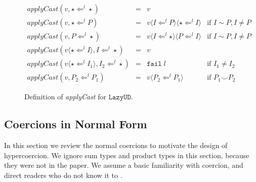 \documentclass[acmsmall,review,anonymous]{acmart}\settopmatter{printfolios=true,printccs=false,printacmref=false}
\newcommand{\stxrule}[3]{#1 & ::= & #3 & \text{#2}\\}
\newcommand{\lazyUD}{$\mathtt{Lazy UD}$}
\newcommand{\cOOcast}[3]{#3 \Leftarrow^{#2} #1}
\newcommand{\vOOcast}[2]{\langle#2\rangle#1}
\newcommand{\rOOfail}[1]{\mathtt{fail}\;#1}
\begin{document}
\begin{figure}
%
%  
  \[
  \begin{array}{rclr}
    \mathit{applyCast}(v, \cOOcast{\star}{l}{\star} ) &=& v \\
    \mathit{applyCast}(v, \cOOcast{P}{l}{\star}) &=&
        v \langle \cOOcast{P}{l}{I} \rangle
          \langle \cOOcast{I}{l}{\star} \rangle
        & \text{if } I \sim P, I \neq P \\  
    \mathit{applyCast}(v, \cOOcast{\star}{l}{P}) &=&          
        v \langle \cOOcast{\star}{l}{I} \rangle
          \langle \cOOcast{I}{l}{P} \rangle
        & \text{if } I \sim P, I \neq P \\  
  \mathit{applyCast}(v \langle \cOOcast{I}{l}{\star} \rangle , \cOOcast{\star}{l}{I}) &=& v \\
  \mathit{applyCast}(v \langle \cOOcast{I_1}{l}{\star} \rangle , \cOOcast{\star}{l}{I_2}) &=& \rOOfail{l} & \text{if } I_1 \neq I_2 \\
  \mathit{applyCast}(v, \cOOcast{P_1}{l}{P_2}) &=&
     v \langle \cOOcast{P_1}{l}{P_2} \rangle & \text{if } P_1 \smile P_2
  \end{array}
  \]


  \caption{Definition of \textit{applyCast} for \lazyUD{}.}
  \label{fig:apply-Cast-UD}
\end{figure}


\clearpage
\pagebreak

\subsection{Coercions in Normal Form} 
\label{sec:coercion-calculus}

In this section we review the normal coercions \citep{siek2012interpretations} 
to motivate the design of hypercoercion. 
We ignore sum types and product types in this 
section, because they were not in the paper. We assume a basic 
familiarity with coercion, and direct readers who do not know it to 
\citet{siek2012interpretations}.
\end{document}
